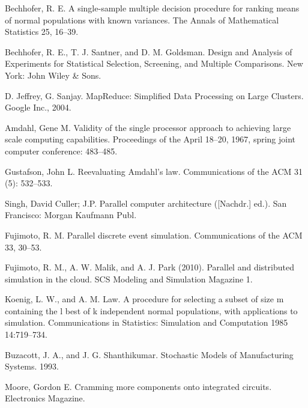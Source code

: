 \documentclass[12pt,a4paper]{report}
\begin{document}
\begin{thebibliography}{99}
 Bechhofer, R. E. A single-sample multiple decision procedure for ranking means of normal populations with known variances. The Annals of Mathematical Statistics 25, 16–39.

 Bechhofer, R. E., T. J. Santner, and D. M. Goldsman. Design and Analysis of Experiments for Statistical Selection, Screening, and Multiple Comparisons. New York: John Wiley \& Sons.

 D. Jeffrey, G. Sanjay. MapReduce: Simplified Data Processing on Large Clusters. Google Inc., 2004.

 Amdahl, Gene M. Validity of the single processor approach to achieving large scale computing capabilities. Proceedings of the April 18–20, 1967, spring joint computer conference: 483–485.

 Gustafson, John L. Reevaluating Amdahl's law. Communications of the ACM 31 (5): 532–533.

 Singh, David Culler; J.P. Parallel computer architecture ([Nachdr.] ed.). San Francisco: Morgan Kaufmann Publ.

 Fujimoto, R. M. Parallel discrete event simulation. Communications of the ACM 33, 30–53.

 Fujimoto, R. M., A. W. Malik, and A. J. Park (2010). Parallel and distributed simulation in the cloud. SCS Modeling and Simulation Magazine 1.

 Koenig, L. W., and A. M. Law. A procedure for selecting a subset of size m containing the l best of k independent normal populations, with applications to simulation. Communications in Statistics: Simulation and Computation 1985 14:719–734.

 Buzacott, J. A., and J. G. Shanthikumar. Stochastic Models of Manufacturing Systems. 1993.

 Moore, Gordon E. Cramming more components onto integrated circuits. Electronics Magazine.

\end{thebibliography}
\end{document}

